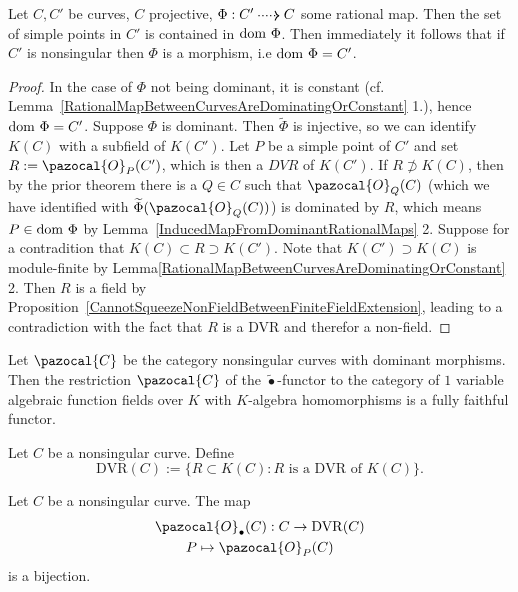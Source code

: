         \begin{corollary}\label{SetOfSimplePointsIsContainedInDomainOfRationalMapBetweenCurves}
            Let $C,C'$ be curves, $C$ projective, $\Phi: C' \dottedarrow C$ some rational map. Then the set of simple points in $C'$ is contained in $\mathrm{dom}\ \Phi$. Then immediately it follows that if $C'$ is nonsingular then $\Phi$ is a morphism, i.e $\mathrm{dom}\ \Phi = C'$. 
        \end{corollary}
        \begin{proof}
            In the case of $\Phi$ not being dominant, it is constant (cf. Lemma~\ref{RationalMapBetweenCurvesAreDominatingOrConstant} 1.), hence $\mathrm{dom}\ \Phi = C'$. Suppose $\Phi$ is dominant. Then $\widetilde{\Phi}$ is injective, so we can identify $K(C)$ with a subfield of $K(C')$. Let $P$ be a simple point of $C'$ and set $R:=\pazocal{O}_P(C')$, which is then a $DVR$ of $K(C')$. If $R\not\supset K(C)$, then by the prior theorem there is a $Q\in C$ such that $\pazocal{O}_Q(C)$ (which we have identified with $\widetilde{\Phi}(\pazocal{O}_Q(C))$) is dominated by $R$, which means $P\in \mathrm{dom} \ \Phi$ by Lemma~\ref{InducedMapFromDominantRationalMaps} 2. Suppose for a contradition that $K(C)\subset R \supset K(C')$. Note that $K(C')\supset K(C)$ is module-finite by Lemma\ref{RationalMapBetweenCurvesAreDominatingOrConstant} 2. Then $R$ is a field by Proposition~\ref{CannotSqueezeNonFieldBetweenFiniteFieldExtension}, leading to a contradiction with the fact that $R$ is a DVR and therefor a non-field.
        \end{proof}
        \begin{corollary}
            Let $\pazocal{C}$ be the category nonsingular curves with dominant morphisms. Then the restriction $\pazocal{C}$ of the $\widetilde{\bullet}$-functor to the category of $1$ variable algebraic function fields over $K$ with $K$-algebra homomorphisms is a fully faithful functor.
        \end{corollary}
        \begin{definition}
            Let $C$ be a nonsingular curve. Define 
            $$\mathrm{DVR}(C):= \{ R\subset K(C): R\text{  is a DVR of } K(C)\}.$$
        \end{definition}
        \begin{corollary}\label{SimplePointsInBijectionWithDVRsOfFunctionField}
            Let $C$ be a nonsingular curve. The map 
            \begin{gather*}
                \pazocal{O}_\bullet(C): C \rightarrow \mathrm{DVR}(C)\\
                P \mapsto \pazocal{O}_P(C) 
            \end{gather*} 
            is a bijection.
        \end{corollary}
